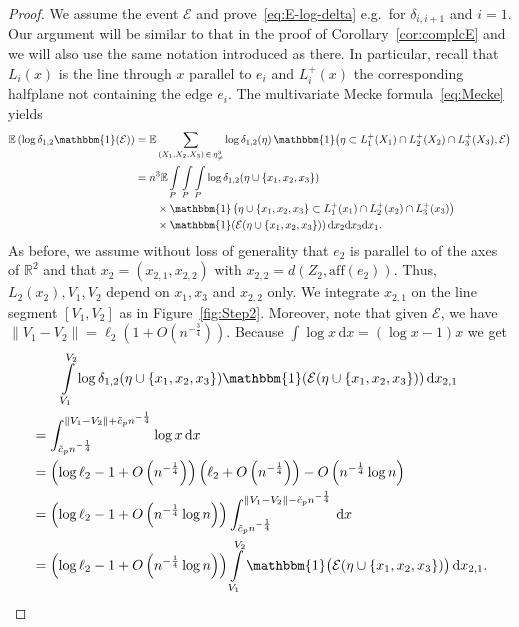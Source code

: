 \documentclass[AHL,Unicode,longabstracts,published]{cedram}
\newcommand{\ind}{\mathbbm{1}}
\newcommand{\bbR}{\mathbb{R}}
\newcommand{\bbE}{\mathbb{E}}
\newcommand{\clE}{\mathcal{E}}
\newcommand{\aff}{\mathrm{aff}}
\let\oldtilde\tilde
\renewcommand*{\tilde}[1]{\mathchoice{\widetilde{#1}}{\widetilde{#1}}{\oldtilde{#1}}{\oldtilde{#1}}}
\begin{document}
\begin{proof}
We assume the event $\clE$ and prove~\eqref{eq:E-log-delta} e.g.\ for $\delta_{i,i+1}$ and $i=1$. Our argument will be similar to that in the proof of Corollary~\ref{cor:complcE} and we will also use the same notation introduced as there. In particular, recall that $L_i(x)$ is the line through $x$ parallel to $e_i$ and $L_i^+(x)$ the corresponding halfplane not containing the edge $e_i$. The multivariate Mecke formula~\eqref{eq:Mecke} yields
\begin{align*}
\bbE \left(\log \delta_{1,2} \ind(\clE)\right) & =
\bbE \sum_{(X_1, X_2, X_3)\,\in\,\eta_{\neq}^3} \log \delta_{1,2}(\eta)\, \ind\big(\eta \subset L_1^+(X_1) \cap L_2^+ (X_2) \cap L_3^+ (X_3), \clE\big)
\\ &= n^3 \bbE \int\limits_{P}\int\limits_{P}\int\limits_{P} \log \delta_{1,2}(\eta\cup\{x_1,x_2,x_3\})
\\ &\qquad \times
\ind\left(\eta\cup\{x_1,x_2,x_3\}\subset L_1^+(x_1) \cap L_2^+ (x_2) \cap L_3^+ (x_3)\right)
\\ &\qquad \times
\ind(\clE(\eta\cup\{x_1,x_2,x_3\}))\, \mathrm{d} x_2 \mathrm{d} x_3 \mathrm{d} x_1.
\end{align*}
As before, we assume without loss of generality that $e_2$ is parallel to of the axes of $\bbR^2$ and that $x_2=(x_{2,1},x_{2,2})$ with $x_{2,2}=d(Z_2,\aff(e_2))$. Thus, $L_2 (x_2), V_1,V_2$ depend on $x_1,x_3$ and $x_{2,2}$ only. We integrate $x_{2,1}$ on the line segment $[V_1,V_2]$ as in Figure~\ref{fig:Step2}. Moreover, note that given $\clE$, we have $\| V_1-V_2 \| = \ell_2(1+O(n^{- \frac 34}))$. Because $ \int \log x\, \mathrm{d} x = (\log x - 1) x $ we get
\begin{multline*}
\int\limits_{V_1}^{V_2} \log \delta_{1,2}(\eta\cup\{x_1,x_2,x_3\}) \ind(\clE(\eta\cup\{x_1,x_2,x_3\})) \, \mathrm{d} x_{2,1}\\
\begin{aligned}
&=\int_{\tilde c_p n^{- \frac 14}}^{\|V_1-V_2\|+ \tilde c_p n^{- \frac 14}} \log x \, \mathrm{d} x \\
&= \left(\log \ell_2 - 1 +O\left(n^{- \frac 14}\right)\right) \left(\ell_2 + O\left(n^{- \frac 14}\right)\right) - O\left(n^{- \frac 14} \log n\right)
\\ &=
\left(\log \ell_2 - 1 +O\left(n^{- \frac 14} \log n\right)\right) \int_{\tilde c_p n^{- \frac 14}}^{\|V_1-V_2\|- \tilde c_p n^{- \frac 14}} \, \mathrm{d} x
\\ &=
\left(\log \ell_2 - 1 +O\left(n^{- \frac 14} \log n\right)\right) \int\limits_{V_1}^{V_2} \ind\big(\clE(\eta\cup\{x_1,x_2,x_3\})\big) \, \mathrm{d} x_{2,1}.

\end{aligned}
\end{multline*}
\end{proof}
\end{document}
